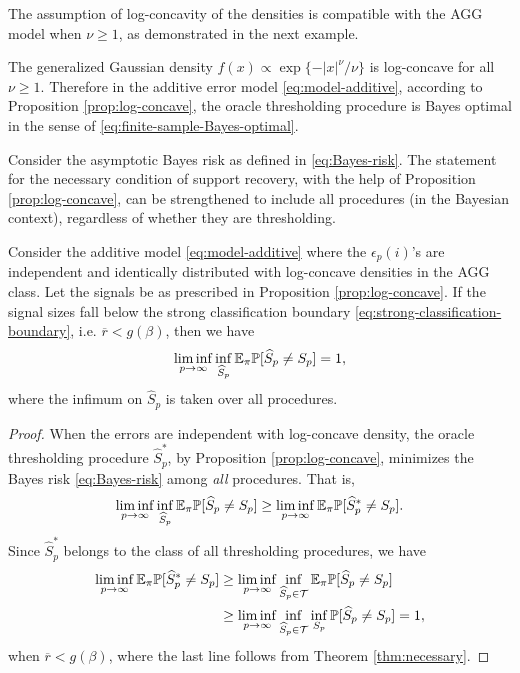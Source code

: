 The assumption of log-concavity of the densities is compatible with the AGG model when $\nu\ge1$, as 
demonstrated in the next example.

\begin{example} \label{exmp:AGG-logconcave}
The generalized Gaussian density $f(x)\propto \exp\{-|x|^\nu/\nu\}$ is log-concave for all $\nu\ge1$.
Therefore in the additive error model \eqref{eq:model-additive}, according to Proposition \ref{prop:log-concave}, the oracle thresholding procedure is Bayes optimal in the sense of \eqref{eq:finite-sample-Bayes-optimal}.
\end{example}



Consider the asymptotic Bayes risk as defined in \eqref{eq:Bayes-risk}. The statement for the 
necessary condition of support recovery, with the help of Proposition \ref{prop:log-concave}, can be 
strengthened to include all procedures (in the Bayesian context), regardless of whether they are thresholding.

\begin{theorem} \label{thm:necessary-strengthened}
Consider the additive model \eqref{eq:model-additive} where the $\epsilon_p(i)$'s are independent and identically distributed with log-concave densities in the AGG class. 
Let the signals be as prescribed in Proposition \ref{prop:log-concave}.
If the signal sizes fall below the strong classification boundary \eqref{eq:strong-classification-boundary}, i.e. $\overline{r}<g(\beta)$,
then we have
\begin{equation} \label{eq:classification-impossible-Bayes}
    \liminf_{p\to\infty} \inf_{\widehat{S}_p} {\mathbb E}_\pi {\mathbb P}[\widehat{S}_p\neq S_p] = 1,
\end{equation}
where the infimum on $\widehat{S}_p$ is taken over all procedures.
\end{theorem}

\begin{proof}%
When the errors are independent with log-concave density, the oracle thresholding procedure $\widehat{S}^*_p$, by Proposition \ref{prop:log-concave}, minimizes the Bayes risk \eqref{eq:Bayes-risk} among \emph{all} procedures. That is,
$$
\liminf_{p\to\infty} \inf_{\widehat{S}_p} {\mathbb E}_\pi{\mathbb P}[\widehat{S}_p\neq S_p]
\ge \liminf_{p\to\infty} {\mathbb E}_\pi{\mathbb P}[\widehat{S}^*_p\neq S_p].
$$
Since $\widehat{S}^*_p$ belongs to the class of all thresholding procedures, we have
\begin{align*}
    \liminf_{p\to\infty} {\mathbb E}_\pi{\mathbb P}[\widehat{S}^*_p\neq S_p] 
    &\ge \liminf_{p\to\infty} \inf_{\widehat{S}_p\in{\cal T}} {\mathbb E}_\pi{\mathbb P}[\widehat{S}_p\neq S_p] \\
    &\ge \liminf_{p\to\infty} \inf_{\widehat{S}_p\in{\cal T}} \inf_{S_p} {\mathbb P}[\widehat{S}_p\neq S_p] = 1,
\end{align*}
when $\overline{r}<g(\beta)$, where the last line follows from Theorem \ref{thm:necessary}.
\end{proof}

